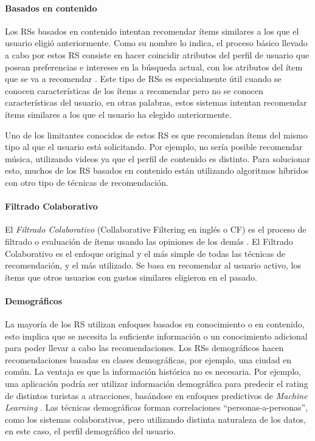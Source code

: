 \paragraph{Basados en contenido}
Los RSs basados en contenido intentan recomendar ítems similares a los que el usuario eligió anteriormente. Como su nombre lo indica, el proceso básico llevado a cabo por estos RS consiste en hacer coincidir atributos del perfil de usuario que posean preferencias e intereses en la búsqueda actual, con los atributos del ítem que se va a recomendar \citep{lops2011content}. Este tipo de RSs es especialmente útil cuando se conocen características de los ítems a recomendar pero no se conocen características del usuario, en otras palabras, estos sistemas intentan recomendar ítems similares a los que el usuario ha elegido anteriormente.

\bigskip Uno de los limitantes conocidos de estos RS es que recomiendan ítems del mismo tipo al que el usuario está solicitando. Por ejemplo, no sería posible recomendar música, utilizando videos ya que el perfil de contenido es distinto. Para solucionar esto, muchos de los RS basados en contenido están utilizando algoritmos híbridos con otro tipo de técnicas de recomendación.

\paragraph{Filtrado Colaborativo}
El \textit{Filtrado Colaborativo} (Collaborative Filtering en inglés o CF) es el proceso de filtrado o evaluación de ítems usando las opiniones de los demás \citep{schafer2007collaborative}. El Filtrado Colaborativo es el enfoque original y el más simple de todas las técnicas de recomendación, y el más utilizado. Se basa en recomendar al usuario activo, los ítems que otros usuarios con gustos similares eligieron en el pasado.

\paragraph{Demográficos}
La mayoría de los RS utilizan enfoques basados en conocimiento o en contenido, esto implica que se necesita la suficiente información o un conocimiento adicional para poder llevar a cabo las recomendaciones. Los RSs demográficos hacen recomendaciones basadas en clases demográficas, por ejemplo, una ciudad en común. La ventaja es que la información histórica no es necesaria. Por ejemplo, una aplicación podría ser utilizar información demográfica para predecir el rating de distintos turistas a atracciones, basándose en enfoques predictivos de \textit{Machine Learning} \citep{wang2012applicability}. Las técnicas demográficas forman correlaciones “personas-a-personas”, como los sistemas colaborativos, pero utilizando distinta naturaleza de los datos, en este caso, el perfil demográfico del usuario.


